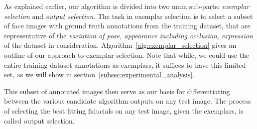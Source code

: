 \label{subsec:algorithm_outline}
As explained earlier, our algorithm is divided into two main sub-parts: \emph{exemplar selection}
and \emph{output selection}.
The task in exemplar selection 
is to select a subset of face images with ground truth annotations from the training dataset, 
that are representative of the \emph{variation of pose, appearance including occlusion, expression}
\etc of the dataset in consideration. Algorithm~\ref{alg:exemplar_selection} gives an outline
of our approach to exemplar selection. Note that while, we could use the entire training dataset
annotations as exemplars, it suffices to have this limited set, as we will show in
section~\ref{subsec:experimental_analysis}.

This subset of annotated images then serve as our basis for differentiating between
the various candidate algorithm outputs on any test image. The process of selecting 
the best fitting fiducials on any test image, given the exemplars, is called
output selection.
